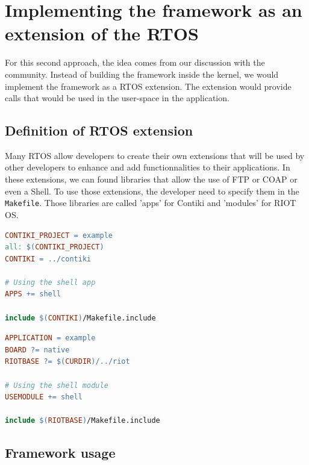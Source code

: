 \section{Implementing the framework as an extension of the RTOS \label{sec:extension}}

For this second approach, the idea comes from our discussion with the community.
Instead of building the framework inside the kernel, we would implement the framework as a RTOS extension.
The extension would provide calls that would be used in the user-space in the application.

\subsection{Definition of RTOS extension}

Many RTOS allow developers to create their own extensions that will be used by other developers to enhance and add functionnalities to their applications.
In these extensions, we can found libraries that allow the use of FTP or COAP or even a Shell.
To use those extensions, the developer need to specify them in the \texttt{Makefile}.
Those libraries are called 'apps' for Contiki and 'modules' for RIOT OS.

\begin{minipage}{.45\textwidth}
\begin{lstlisting}[style=CStyle, language=make, caption=Example of Makefile using the app \texttt{shell} with Contiki]
CONTIKI_PROJECT = example
all: $(CONTIKI_PROJECT)
CONTIKI = ../contiki

# Using the shell app
APPS += shell 

include $(CONTIKI)/Makefile.include
\end{lstlisting}
\end{minipage}\hfill
\begin{minipage}{.45\textwidth}
\begin{lstlisting}[style=CStyle, language=make, caption=Example of Makefile using the module \texttt{shell} with RIOT OS]
APPLICATION = example
BOARD ?= native
RIOTBASE ?= $(CURDIR)/../riot

# Using the shell module
USEMODULE += shell 

include $(RIOTBASE)/Makefile.include
\end{lstlisting}
\end{minipage}

\subsection{Framework usage} %

